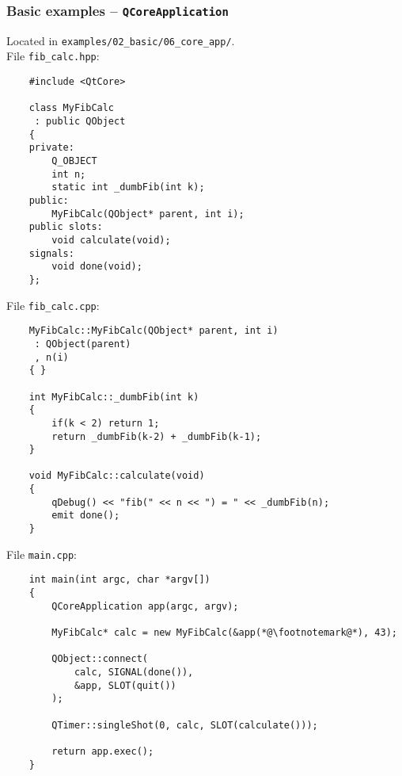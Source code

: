 \begin{frame}[fragile]
  \frametitle{Basic examples -- \texttt{QCoreApplication}}
  Located in \texttt{examples/02\_basic/06\_core\_app/}.\\
  File \texttt{fib\_calc.hpp}:
  \begin{lstlisting}
	#include <QtCore>

	class MyFibCalc
 	 : public QObject
	{
	private:
	    Q_OBJECT
	    int n;
	    static int _dumbFib(int k);
	public:
	    MyFibCalc(QObject* parent, int i);
	public slots:
	    void calculate(void);
	signals:
	    void done(void);
	};
  \end{lstlisting}
\end{frame}

\begin{frame}[fragile]
  File \texttt{fib\_calc.cpp}:
  \begin{lstlisting}
	MyFibCalc::MyFibCalc(QObject* parent, int i)
 	 : QObject(parent)
 	 , n(i)
	{ }

	int MyFibCalc::_dumbFib(int k)
	{
	    if(k < 2) return 1;
	    return _dumbFib(k-2) + _dumbFib(k-1);
	}

	void MyFibCalc::calculate(void)
	{
	    qDebug() << "fib(" << n << ") = " << _dumbFib(n);
	    emit done();
	}
  \end{lstlisting}
\end{frame}

\begin{frame}[fragile]
  File \texttt{main.cpp}:
  \begin{lstlisting}
	int main(int argc, char *argv[])
	{
	    QCoreApplication app(argc, argv);

	    MyFibCalc* calc = new MyFibCalc(&app(*@\footnotemark@*), 43);

	    QObject::connect(
	        calc, SIGNAL(done()),
	        &app, SLOT(quit())
	    );

	    QTimer::singleShot(0, calc, SLOT(calculate()));

	    return app.exec();
	}
  \end{lstlisting}
\end{frame}

